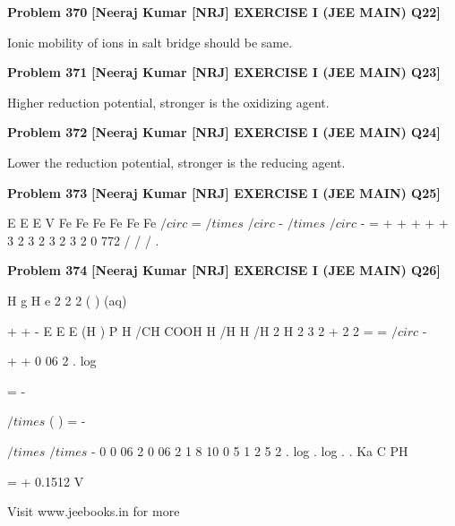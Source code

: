 \begin{problembox}
\textbf{Problem 370} \hfill \textbf{[Neeraj Kumar [NRJ] EXERCISE I (JEE MAIN) Q22]}
\label{q:ext-nrj_all_questions-370}

Ionic mobility of ions in salt bridge should be 
same.
\end{problembox}

\begin{problembox}
\textbf{Problem 371} \hfill \textbf{[Neeraj Kumar [NRJ] EXERCISE I (JEE MAIN) Q23]}
\label{q:ext-nrj_all_questions-371}

Higher reduction potential, stronger is the 
oxidizing agent.
\end{problembox}

\begin{problembox}
\textbf{Problem 372} \hfill \textbf{[Neeraj Kumar [NRJ] EXERCISE I (JEE MAIN) Q24]}
\label{q:ext-nrj_all_questions-372}

Lower the reduction potential, stronger is the 
reducing agent.
\end{problembox}

\begin{problembox}
\textbf{Problem 373} \hfill \textbf{[Neeraj Kumar [NRJ] EXERCISE I (JEE MAIN) Q25]}
\label{q:ext-nrj_all_questions-373}

E
E
E
V
Fe
Fe
Fe
Fe
Fe
Fe
$/circ$
=
$/times$
$/circ$
-
$/times$
$/circ$
-
= +
+
+
+
+
3
2
3
2
3
2
3
2
0 772
/
/
/
.
\end{problembox}

\begin{problembox}
\textbf{Problem 374} \hfill \textbf{[Neeraj Kumar [NRJ] EXERCISE I (JEE MAIN) Q26]}
\label{q:ext-nrj_all_questions-374}

H
g
H
e
2
2
2
( )
(aq)

  


 



+
+
-
E
E
E
(H )
P
H /CH COOH
H /H
H /H
2
H
2
3
2
+
2
2
=
=
$/circ$
-
 
+
+
0 06
2
.
log
 
  
              
=
-
 
$/times$
(
)
= -
 
$/times$
$/times$
-
0
0 06
2
0 06
2
1 8 10
0 5
1
2
5
2
.
log
.
log .
.
Ka
C
PH
 
                       = + 0.1512 V
 
 
Visit www.jeebooks.in for more
\end{problembox}


